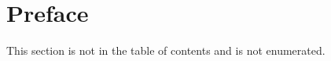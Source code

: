 \section*{Preface}

This section is not in the table of contents and is not enumerated.


\clearpage

